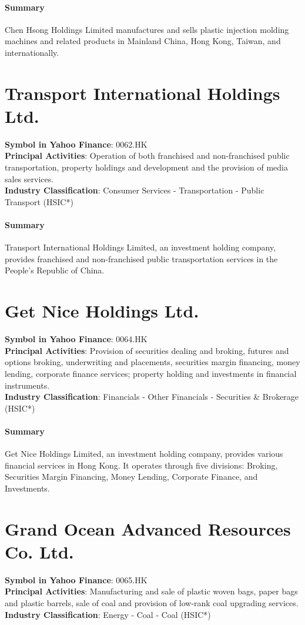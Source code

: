 \paragraph{Summary}
Chen Hsong Holdings Limited manufactures and sells plastic injection molding machines and related products in Mainland China, Hong Kong, Taiwan, and internationally.


\section{Transport International Holdings Ltd.}
\textbf{Symbol in Yahoo Finance}: 0062.HK\\
\textbf{Principal Activities}: Operation of both franchised and non-franchised public transportation, property holdings and development and the provision of media sales services.\\
\textbf{Industry Classification}: Consumer Services - Transportation - Public Transport (HSIC*)
\paragraph{Summary}
Transport International Holdings Limited, an investment holding company, provides franchised and non-franchised public transportation services in the People's Republic of China.


\section{Get Nice Holdings Ltd.}
\textbf{Symbol in Yahoo Finance}: 0064.HK\\
\textbf{Principal Activities}: Provision of securities dealing and broking, futures and options broking, underwriting and placements, securities margin financing, money lending, corporate finance services; property holding and investments in financial instruments.\\
\textbf{Industry Classification}: Financials - Other Financials - Securities \& Brokerage (HSIC*)
\paragraph{Summary}
Get Nice Holdings Limited, an investment holding company, provides various financial services in Hong Kong. It operates through five divisions: Broking, Securities Margin Financing, Money Lending, Corporate Finance, and Investments.


\section{Grand Ocean Advanced Resources Co. Ltd.}
\textbf{Symbol in Yahoo Finance}: 0065.HK\\
\textbf{Principal Activities}: Manufacturing and sale of plastic woven bags, paper bags and plastic barrels, sale of coal and provision of low-rank coal upgrading services.\\
\textbf{Industry Classification}: Energy - Coal - Coal (HSIC*)
